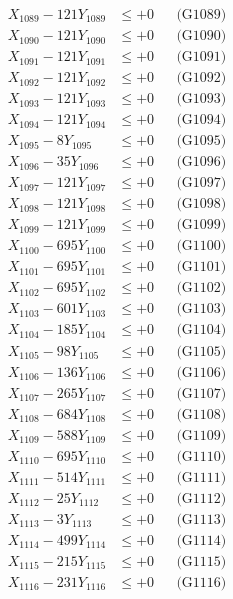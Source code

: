 \documentclass[a4paper,10pt]{article}
\begin{document}
{\begin{align}
X_{1089} - 121Y_{1089} &\leq +0 && \text{(G1089)} \\
X_{1090} - 121Y_{1090} &\leq +0 && \text{(G1090)} \\
\allowbreak
X_{1091} - 121Y_{1091} &\leq +0 && \text{(G1091)} \\
X_{1092} - 121Y_{1092} &\leq +0 && \text{(G1092)} \\
X_{1093} - 121Y_{1093} &\leq +0 && \text{(G1093)} \\
X_{1094} - 121Y_{1094} &\leq +0 && \text{(G1094)} \\
X_{1095} - 8Y_{1095} &\leq +0 && \text{(G1095)} \\
X_{1096} - 35Y_{1096} &\leq +0 && \text{(G1096)} \\
X_{1097} - 121Y_{1097} &\leq +0 && \text{(G1097)} \\
X_{1098} - 121Y_{1098} &\leq +0 && \text{(G1098)} \\
X_{1099} - 121Y_{1099} &\leq +0 && \text{(G1099)} \\
X_{1100} - 695Y_{1100} &\leq +0 && \text{(G1100)} \\
\allowbreak
X_{1101} - 695Y_{1101} &\leq +0 && \text{(G1101)} \\
X_{1102} - 695Y_{1102} &\leq +0 && \text{(G1102)} \\
X_{1103} - 601Y_{1103} &\leq +0 && \text{(G1103)} \\
X_{1104} - 185Y_{1104} &\leq +0 && \text{(G1104)} \\
X_{1105} - 98Y_{1105} &\leq +0 && \text{(G1105)} \\
X_{1106} - 136Y_{1106} &\leq +0 && \text{(G1106)} \\
X_{1107} - 265Y_{1107} &\leq +0 && \text{(G1107)} \\
X_{1108} - 684Y_{1108} &\leq +0 && \text{(G1108)} \\
X_{1109} - 588Y_{1109} &\leq +0 && \text{(G1109)} \\
X_{1110} - 695Y_{1110} &\leq +0 && \text{(G1110)} \\
\allowbreak
X_{1111} - 514Y_{1111} &\leq +0 && \text{(G1111)} \\
X_{1112} - 25Y_{1112} &\leq +0 && \text{(G1112)} \\
X_{1113} - 3Y_{1113} &\leq +0 && \text{(G1113)} \\
X_{1114} - 499Y_{1114} &\leq +0 && \text{(G1114)} \\
X_{1115} - 215Y_{1115} &\leq +0 && \text{(G1115)} \\
X_{1116} - 231Y_{1116} &\leq +0 && \text{(G1116)} \\

\end{align}}
\end{document}

